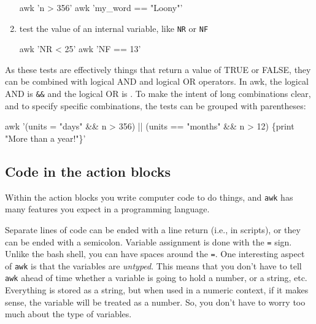 \documentclass[]{krantz}
\makeatletter
\newenvironment{Shaded}{\begin{snugshade}}{\end{snugshade}}
\newcommand{\FunctionTok}[1]{\textcolor[rgb]{0,0,0}{#1}}
\newcommand{\StringTok}[1]{\textcolor[rgb]{0.5,0.5,0.5}{#1}}
\newenvironment{kframe}{%
\medskip{}
\setlength{\fboxsep}{.8em}
 \def\at@end@of@kframe{}%
 \ifinner\ifhmode%
  \def\at@end@of@kframe{\end{minipage}}%
  \begin{minipage}{\columnwidth}%
 \fi\fi%
 \def\FrameCommand##1{\hskip\@totalleftmargin \hskip-\fboxsep
 \colorbox{shadecolor}{##1}\hskip-\fboxsep
     \hskip-\linewidth \hskip-\@totalleftmargin \hskip\columnwidth}%
 \MakeFramed {\advance\hsize-\width
   \@totalleftmargin\z@ \linewidth\hsize
   \@setminipage}}%
 {\par\unskip\endMakeFramed%
 \at@end@of@kframe}
\renewenvironment{Shaded}{\begin{kframe}}{\end{kframe}}
\makeatother
\begin{document}
\begin{enumerate}
\begin{Shaded}
\begin{Highlighting}[]
\FunctionTok{awk} \StringTok{'n > 356'}
\FunctionTok{awk} \StringTok{'my_word == "Loony"'}
\end{Highlighting}
\end{Shaded}
\item
  test the value of an internal variable, like \texttt{NR} or \texttt{NF}

\begin{Shaded}
\begin{Highlighting}[]
\FunctionTok{awk} \StringTok{'NR < 25'}
\FunctionTok{awk} \StringTok{'NF == 13'}
\end{Highlighting}
\end{Shaded}
\end{enumerate}

As these tests are effectively things that return a value of TRUE or FALSE, they can
be combined with logical AND and logical OR operators. In awk, the logical AND is
\texttt{\&\&} and the logical OR is \texttt{\textbar{}\textbar{}}. To make the intent of long combinations clear, and to
specify specific combinations, the tests can be grouped with parentheses:

\begin{Shaded}
\begin{Highlighting}[]
\FunctionTok{awk} \StringTok{'(units = "days" && n > 356) || (units == "months" && n > 12) \{print "More than a year!"\}'}
\end{Highlighting}
\end{Shaded}

\hypertarget{code-in-the-action-blocks}{%
\subsection{Code in the action blocks}\label{code-in-the-action-blocks}}

Within the action blocks you write computer code to do things, and \texttt{awk} has many features
you expect in a programming language.

Separate lines of code can be ended with a line return (i.e., in scripts), or they can be
ended with a semicolon.
Variable assignment is done with the \texttt{=} sign. Unlike the bash shell, you can have spaces around
the \texttt{=}. One interesting aspect of \texttt{awk} is that the
variables are \emph{untyped}. This means that you don't have to tell \texttt{awk} ahead of time whether
a variable is going to hold a number, or a string, etc. Everything is stored as a string,
but when used in a numeric context, if it makes sense, the variable will be treated
as a number. So, you don't have to worry too much about the type of variables.
\end{document}
